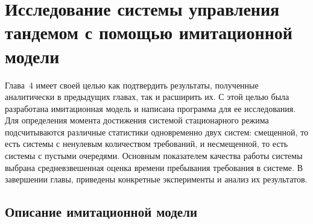 \documentclass[a4paper,12pt,russian]{extarticle}
\begin{document}
\newpage
\section{Исследование системы управления тандемом с помощью имитационной модели}
Глава~4 имеет своей целью как подтвердить результаты, полученные аналитически в предыдущих главах, так и расширить их. С этой целью была разработана имитационная модель и написана программа для ее исследования. Для определения момента достижения системой стационарного режима подсчитываются различные статистики одновременно двух систем: смещенной, то есть системы с ненулевым количеством требований, и несмещенной, то есть системы с пустыми очередями. Основным показателем качества работы системы выбрана средневзвешенная оценка времени пребывания требования в системе. В завершении главы, приведены конкретные эксперименты и анализ их результатов.

\subsection{Описание имитационной модели}
\end{document}
